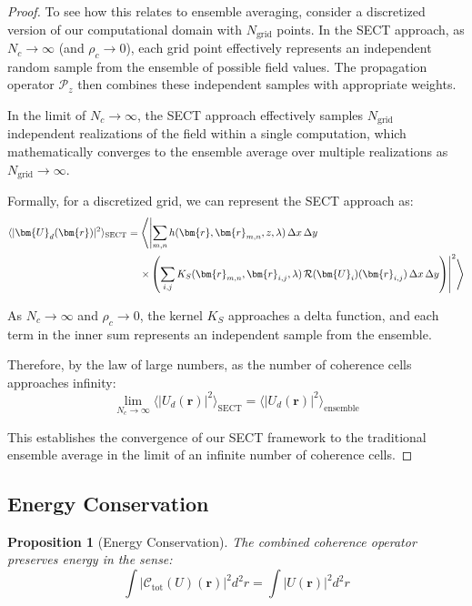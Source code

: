 \documentclass[a4paper,12pt]{article}
\newtheorem{proposition}[theorem]{Proposition}
\begin{document}
\begin{proof}
To see how this relates to ensemble averaging, consider a discretized version of our computational domain 
with $N_{\text{grid}}$ points. In the SECT approach, as $N_c \to \infty$ (and $\rho_c \to 0$), each grid point 
effectively represents an independent random sample from the ensemble of possible field values. The propagation 
operator $\mathcal{P}_z$ then combines these independent samples with appropriate weights.

In the limit of $N_c \to \infty$, the SECT approach effectively samples $N_{\text{grid}}$ independent realizations 
of the field within a single computation, which mathematically converges to the ensemble average over multiple 
realizations as $N_{\text{grid}} \to \infty$.

Formally, for a discretized grid, we can represent the SECT approach as:
\begin{align}
\langle |\bm{U}_d(\bm{r})|^2 \rangle_{\text{SECT}} 
&= \left\langle \left| \sum_{m,n} h(\bm{r}, \bm{r}_{m,n}, z, \lambda)\, \Delta x\, \Delta y \right. \right. \notag \\
&\quad \left. \left. \times \left( \sum_{i,j} K_S(\bm{r}_{m,n}, \bm{r}_{i,j}, \lambda)\, \mathcal{R}(\bm{U}_i)(\bm{r}_{i,j})\, \Delta x\, \Delta y \right) \right|^2 \right\rangle
\end{align}

As $N_c \to \infty$ and $\rho_c \to 0$, the kernel $K_S$ approaches a delta function, and each term in the inner sum represents an independent sample from the ensemble. 

Therefore, by the law of large numbers, as the number of coherence cells approaches infinity:
\begin{equation}
\lim_{N_c \to \infty} \langle |U_d(\bm{r})|^2 \rangle_{\text{SECT}} = \langle |U_d(\bm{r})|^2 \rangle_{\text{ensemble}}
\end{equation}

This establishes the convergence of our SECT framework to the traditional ensemble average in the limit of an infinite number of coherence cells.
\end{proof}


\subsection{Energy Conservation}

\begin{proposition}[Energy Conservation] \label{prop:energy}
The combined coherence operator preserves energy in the sense:
\begin{equation}
\int |\mathcal{C}_{\text{tot}}(U)(\bm{r})|^2 d^2r = \int |U(\bm{r})|^2 d^2r
\end{equation}
\end{proposition}
\end{document}
